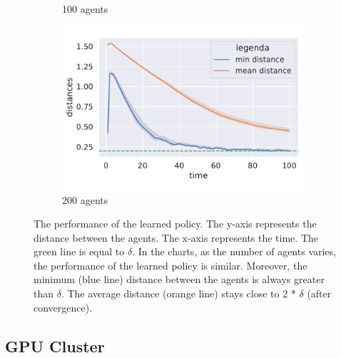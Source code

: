 \documentclass[12pt,a4paper,openright,twoside]{book}
\begin{document}
\begin{figure}[h!]
\begin{subfigure}[b]{0.32\textwidth}
            \caption{100 agents}
        \end{subfigure}
        \hfill
        \begin{subfigure}[b]{0.32\textwidth}
            \centering
            \includegraphics[width=\textwidth]{figures/data-200.pdf}
            \caption{200 agents}
        \end{subfigure}
    \caption{The performance of the learned policy. 
    The y-axis represents the distance between the agents.
    The x-axis represents the time.
    The green line is equal to $\delta$.
    In the charts, as the number of agents varies, the performance of the learned policy is similar.
    Moreover, the minimum (blue line) distance between the agents is always greater than $\delta$.
    The average distance (orange line) stays close to 2 * $\delta$ (after convergence).
    }
    \label{fig:test}
    \end{figure}

\section{GPU Cluster}

\chapter{\conclusionsname}
\label{chap:conclusions}





\end{document}
